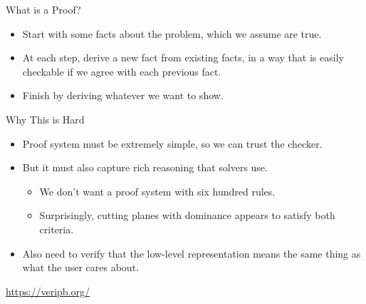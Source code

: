 \documentclass[aspectratio=169,compress,10pt]{beamer}
\begin{document}
\begin{frame}[fragile]{What is a Proof?}
     \begin{itemize}
         \item Start with some facts about the problem, which we assume are true.
         \item At each step, derive a new fact from existing facts, in a way that is easily
             checkable if we agree with each previous fact.
         \item Finish by deriving whatever we want to show.
     \end{itemize}
\end{frame}

\begin{frame}{Why This is Hard}
    \begin{itemize}
        \item Proof system must be extremely simple, so we can trust the checker.
        \item But it must also capture rich reasoning that solvers use.
            \begin{itemize}
                \item We don't want a proof system with six hundred rules.
                \item Surprisingly, cutting planes with dominance appears to satisfy both criteria.
            \end{itemize}
        \item Also need to verify that the low-level representation means the same thing as what the
            user cares about.
    \end{itemize}

    \bigskip

    \begin{center}
        \url{https://veripb.org/}
    \end{center}
\end{frame}
\end{document}
